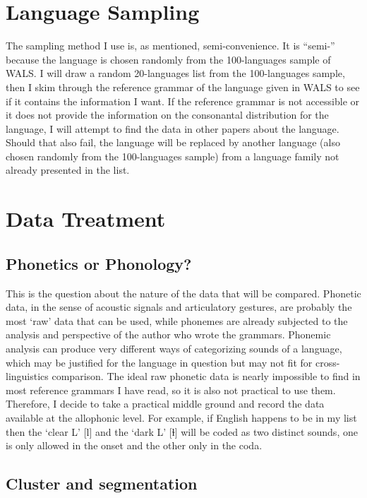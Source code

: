 \section{Language Sampling}

The sampling method I use is, as mentioned, semi-convenience. It is ``semi-'' because the language is chosen randomly from the 100-languages sample of WALS. 
I will draw a random 20-languages list from the 100-languages sample, then I skim through the reference grammar of the language given in WALS to see if it contains the information I want. 
If the reference grammar is not accessible or it does not provide the information on the consonantal distribution for the language, I will attempt to find the data in other papers about the language. 
Should that also fail, the language will be replaced by another language (also chosen randomly from the 100-languages sample) from a language family not already presented in the list.

\section{Data Treatment}

\subsection{Phonetics or Phonology?}

This is the question about the nature of the data that will be compared. 
Phonetic data, in the sense of acoustic signals and articulatory gestures, are probably the most `raw' data that can be used, while phonemes are already subjected to the analysis and perspective of the author who wrote the grammars. 
Phonemic analysis can produce very different ways of categorizing sounds of a language, which may be justified for the language in question but may not fit for cross-linguistics comparison. 
The ideal raw phonetic data is nearly impossible to find in most reference grammars I have read, so it is also not practical to use them.
Therefore, I decide to take a practical middle ground and record the data available at the allophonic level. For example, if English happens to be in my list then the `clear L' [l] and the `dark L' [ɫ] will be coded as two distinct sounds, one is only allowed in the onset and the other only in the coda. 

\subsection{Cluster and segmentation}

